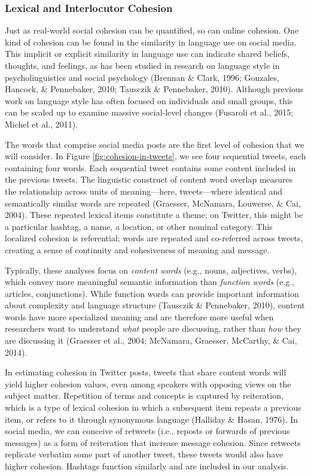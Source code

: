 \documentclass[
  english,
  man]{apa6}
\begin{document}
\hypertarget{lexical-and-interlocutor-cohesion}{%
\subsubsection{Lexical and Interlocutor Cohesion}\label{lexical-and-interlocutor-cohesion}}

Just as real-world social cohesion can be quantified, so can online cohesion.
One kind of cohesion can be found in
the similarity in language use on social media. This implicit or explicit
similarity in language use can indicate shared beliefs, thoughts, and feelings,
as has been studied in research on language style in psycholinguistics and
social psychology (Brennan \& Clark, 1996; Gonzales, Hancock, \& Pennebaker, 2010; Tausczik \& Pennebaker, 2010). Although previous work on language style has often
focused on individuals and small groups, this can be scaled up to examine
massive social-level changes (Fusaroli et al., 2015; Michel et al., 2011).

The words that comprise social media posts are the first level of cohesion that
we will consider. In Figure \ref{fig:cohesion-in-tweets}, we see four
sequential tweets, each containing four words.
Each sequential tweet contains some content included in the previous tweets. The
linguistic construct of content word overlap measures the relationship across
units of meaning---here, tweets---where identical and semantically similar words
are repeated (Graesser, McNamara, Louwerse, \& Cai, 2004). These repeated lexical
items constitute a theme; on Twitter, this might be a particular hashtag, a
name, a location, or other nominal category. This localized cohesion is
referential; words are repeated and co-referred across tweets, creating a sense
of continuity and cohesiveness of meaning and message.

Typically, these analyses focus on \emph{content words} (e.g., nouns, adjectives,
verbs), which convey more meaningful semantic information than \emph{function words}
(e.g., articles, conjunctions). While function words can provide important
information about complexity and language structure
(Tausczik \& Pennebaker, 2010), content words have more specialized meaning and
are therefore more useful when researchers want to understand \emph{what} people are
discussing, rather than \emph{how} they are discussing it (Graesser et al., 2004; McNamara, Graesser, McCarthy, \& Cai, 2014).

In estimating cohesion in Twitter posts, tweets that share content words
will yield higher cohesion values, even among speakers with opposing
views on the subject matter. Repetition of terms and concepts is captured by
reiteration, which is a type of lexical cohesion in which a subsequent item
repeats a previous item, or refers to it through synonymous language
(Halliday \& Hasan, 1976). In social media, we can conceive of retweets (i.e., reposts
or forwards of previous messages) as a form of reiteration
that increase message cohesion. Since retweets replicate verbatim some part of
another tweet, these tweets would also have higher cohesion. Hashtags function
similarly and are included in our analysis.
\end{document}
